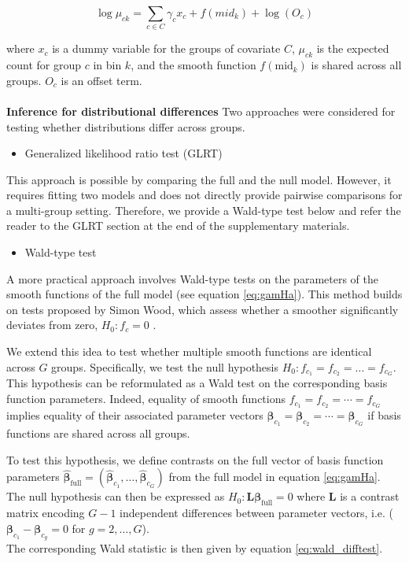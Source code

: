 \begin{equation}
    \log \mu_{ck} = \sum_{c \in C}\gamma_cx_c + f(mid_k) + \log(O_c)
    \label{eq:gamH0}
\end{equation}

where $x_c$ is a dummy variable for the groups of covariate $C$, $\mu_{ck}$ is the expected count for group $c$ in bin $k$, and the smooth function $f(\text{mid}_k)$ is shared across all groups. $O_c$ is an offset term.
\\
\\
\textbf{Inference for distributional differences}
Two approaches were considered for testing whether distributions differ across groups.

\begin{itemize}
    \item Generalized likelihood ratio test (GLRT)
\end{itemize}
This approach is possible by comparing the full and the null model. However, it requires fitting two models and does not directly provide pairwise comparisons for a multi-group setting. Therefore, we provide a Wald-type test below and refer the reader to the GLRT section at the end of the supplementary materials.

\begin{itemize}
    \item Wald-type test
\end{itemize}

A more practical approach involves Wald-type tests on the parameters of the smooth functions of the full model (see equation \ref{eq:gamHa}). This method builds on tests proposed by Simon Wood, which assess whether a smoother significantly deviates from zero, $H_0 : f_c = 0$ \cite{Wald}.

We extend this idea to test whether multiple smooth functions are identical across $G$ groups. Specifically, we test the null hypothesis $H_0 : f_{c_1} = f_{c_2} = \dots = f_{c_G}$.
This hypothesis can be reformulated as a Wald test on the corresponding basis function parameters. Indeed, equality of smooth functions $f_{c_1} = f_{c_2} = \cdots = f_{c_G}$ implies equality of their associated parameter vectors $\boldsymbol{\beta}_{c_1} = \boldsymbol{\beta}_{c_2} = \cdots = \boldsymbol{\beta}_{c_G}$ if basis functions are shared across all groups.

To test this hypothesis, we define contrasts on the full vector of basis function parameters $\hat{\boldsymbol{\beta}}_{\text{full}} = (\hat{\boldsymbol{\beta}}_{c_1}, \dots, \hat{\boldsymbol{\beta}}_{c_G})$ from the full model in equation \ref{eq:gamHa}. The null hypothesis can then be expressed as $H_0: \boldsymbol{L}\boldsymbol{\beta}_{\text{full}} = 0$ where $\boldsymbol{L}$ is a contrast matrix encoding $G-1$ independent differences between parameter vectors, i.e. ($\boldsymbol{\beta}_{c_1} - \boldsymbol{\beta}_{c_g} = 0$ for $g = 2,\ldots,G$).\\
The corresponding Wald statistic is then given by equation \ref{eq:wald_difftest}.

